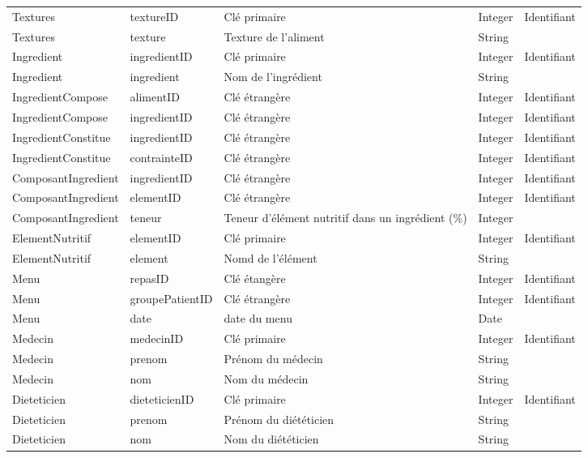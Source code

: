 \begin{longtable}{llp{5cm}ll}
  Textures & textureID & Clé primaire & Integer & Identifiant \\
  Textures & texture & Texture de l'aliment & String & \\ \hline

  Ingredient & ingredientID & Clé primaire & Integer & Identifiant \\
  Ingredient & ingredient & Nom de l'ingrédient & String &  \\ \hline
  IngredientCompose & alimentID & Clé étrangère & Integer & Identifiant \\
  IngredientCompose & ingredientID & Clé étrangère & Integer & Identifiant \\ \hline
  IngredientConstitue & ingredientID & Clé étrangère & Integer & Identifiant \\
  IngredientConstitue & contrainteID & Clé étrangère & Integer & Identifiant \\ \hline

  ComposantIngredient & ingredientID & Clé étrangère & Integer & Identifiant \\
  ComposantIngredient & elementID & Clé étrangère & Integer & Identifiant \\
  ComposantIngredient & teneur & Teneur d'élément nutritif dans un ingrédient (\%) & Integer & \\ \hline

  ElementNutritif & elementID & Clé primaire & Integer & Identifiant \\
  ElementNutritif & element & Nomd de l'élément & String &  \\ \hline

  Menu & repasID & Clé étangère & Integer & Identifiant \\
  Menu & groupePatientID & Clé étrangère & Integer & Identifiant \\
  Menu & date & date du menu & Date & \\

  Medecin & medecinID & Clé primaire & Integer & Identifiant \\
  Medecin & prenom & Prénom du médecin & String & \\
  Medecin & nom & Nom du médecin & String & \\ \hline

  Dieteticien & dieteticienID & Clé primaire & Integer & Identifiant \\
  Dieteticien & prenom & Prénom du diététicien & String & \\
  Dieteticien & nom & Nom du diététicien & String & \\ \hline


\end{longtable}
